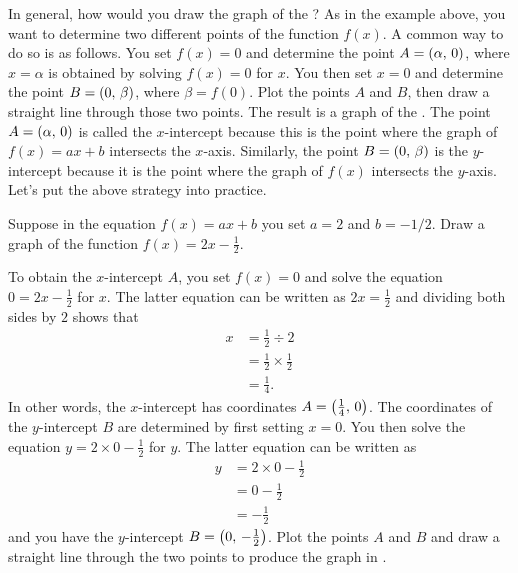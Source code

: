 \documentclass[a4paper,oneside,12pt]{article}
\begin{document}
In general, how would you draw the graph of the
?  As in the example above, you
want to determine two different points of the function $f(x)$.  A
common way to do so is as follows.  You set $f(x) = 0$ and determine
the point $A = \left\lparen{\alpha},\, {0}\right\rparen$, where $x = \alpha$ is obtained by
solving $f(x) = 0$ for $x$.  You then set $x = 0$ and determine the
point $B = \left\lparen{0},\, {\beta}\right\rparen$, where $\beta = f(0)$.  Plot the points
$A$ and $B$, then draw a straight line through those two points.  The
result is a graph of the .  The
point $A = \left\lparen{\alpha},\, {0}\right\rparen$ is called the $x$-intercept because this
is the point where the graph of $f(x) = ax + b$ intersects the
$x$-axis.  Similarly, the point $B = \left\lparen{0},\, {\beta}\right\rparen$ is the
$y$-intercept because it is the point where the graph of $f(x)$
intersects the $y$-axis.  Let's put the above strategy into practice.

\begin{example}
Suppose in the equation $f(x) = ax + b$ you set $a = 2$ and
$b = -1 / 2$.  Draw a graph of the function
$f(x) = 2x - \frac{1}{2}$.
\end{example}

\begin{solution}
To obtain the $x$-intercept $A$, you set $f(x) = 0$ and solve the
equation $0 = 2x - \frac{1}{2}$ for $x$.  The latter equation can be
written as $2x = \frac{1}{2}$ and dividing both sides by $2$ shows
that
\begin{align*}
x
&=
\frac{1}{2} \div 2 \\[4pt]
&=
\frac{1}{2} \times \frac{1}{2} \\[4pt]
&=
\frac{1}{4}.
\end{align*}
In other words, the $x$-intercept has coordinates
$A = \left\lparen{\frac{1}{4}},\, {0}\right\rparen$.  The coordinates of the $y$-intercept
$B$ are determined by first setting $x = 0$.  You then solve the
equation $y = 2 \times 0 - \frac{1}{2}$ for $y$.  The latter equation
can be written as
\begin{align*}
y
&=
2 \times 0 - \frac{1}{2} \\[4pt]
&=
0 - \frac{1}{2} \\[4pt]
&=
-\frac{1}{2}
\end{align*}
and you have the $y$-intercept $B = \left\lparen{0},\, {-\frac{1}{2}}\right\rparen$.  Plot
the points $A$ and $B$ and draw a straight line through the two points
to produce the graph in .
\end{solution}
\end{document}

